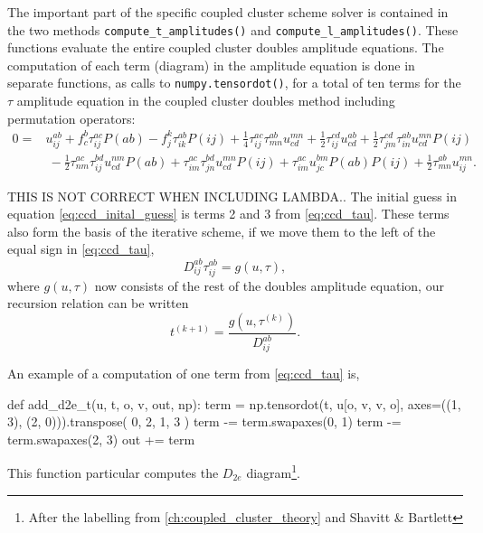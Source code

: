     The important part of the specific coupled cluster scheme solver is contained in the two 
    methods \lstinline{compute_t_amplitudes()} and \lstinline{compute_l_amplitudes()}.
    These functions evaluate the entire coupled cluster doubles amplitude equations.
    The computation of each term (diagram) in the amplitude equation is done in separate functions,
    as calls to \lstinline{numpy.tensordot()}, for a total of ten terms for the 
    $\tau$ amplitude equation in the coupled cluster doubles method including 
    permutation operators:
    \begin{equation}
        \label{eq:ccd_tau}
        \begin{aligned}
        0 =& u^{ab}_{ij} + f^b_c \tau^{ac}_{ij}P(ab) 
            - f^k_j \tau^{ab}_{ik}P(ij)
            + \frac{1}{4} \tau^{ac}_{ij} \tau^{ab}_{mn}u^{mn}_{cd} 
            + \frac{1}{2} \tau^{cd}_{ij}u^{ab}_{cd}
            + \frac{1}{2} \tau^{cd}_{jm} \tau^{ab}_{in} u^{mn}_{cd}P(ij) \\
            &\ - \frac{1}{2} \tau^{ac}_{nm} \tau^{bd}_{ij} u^{nm}_{cd}P(ab)
            + \tau^{ac}_{im} \tau^{bd}_{jn}u^{mn}_{cd}P(ij)
            + \tau^{ac}_{im}u^{bm}_{jc}P(ab)P(ij)
            + \frac{1}{2} \tau^{ab}_{mn}u^{mn}_{ij}.
        \end{aligned}
    \end{equation}

    
   
    THIS IS NOT CORRECT WHEN INCLUDING LAMBDA..
    The initial guess in equation \autoref{eq:ccd_inital_guess} is terms 2 and 3
    from \autoref{eq:ccd_tau}. These terms also form the basis of the iterative scheme,
    if we move them to the left of the equal sign in \autoref{eq:ccd_tau}, 
    \begin{equation}
        D^{ab}_{ij} \tau^{ab}_{ij} = g(u, \tau),
    \end{equation}
    where $g(u, \tau)$ now consists of the rest of the doubles amplitude equation, our 
    recursion relation can be written
    \begin{equation}
        t^{(k+1)} = \frac{g(u,\tau^{(k)})}{D^{ab}_{ij}}.
    \end{equation}
    
    An example of a computation of one term from \autoref{eq:ccd_tau} is,
    \begin{python}
    def add_d2e_t(u, t, o, v, out, np):
        term = np.tensordot(t, u[o, v, v, o], axes=((1, 3), (2, 0))).transpose(
            0, 2, 1, 3
        )
        term -= term.swapaxes(0, 1)
        term -= term.swapaxes(2, 3)
        out += term
    \end{python}
    This function particular computes the $D_{2e}$ diagram\footnote{After the labelling from 
    \autoref{ch:coupled_cluster_theory} and Shavitt \& Bartlett\cite{shavitt2009many}}.

